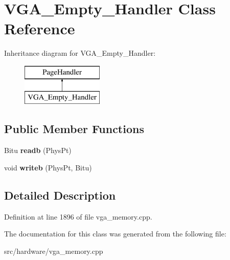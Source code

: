 \hypertarget{classVGA__Empty__Handler}{\section{V\-G\-A\-\_\-\-Empty\-\_\-\-Handler Class Reference}
\label{classVGA__Empty__Handler}
}
Inheritance diagram for V\-G\-A\-\_\-\-Empty\-\_\-\-Handler\-:\begin{figure}[H]
\begin{center}
\leavevmode
\includegraphics[height=2.000000cm]{classVGA__Empty__Handler}
\end{center}
\end{figure}
\subsection*{Public Member Functions}
\begin{DoxyCompactItemize}
\item 
\hypertarget{classVGA__Empty__Handler_ae84a276c3421d6db0f08b48d81692905}{Bitu {\bfseries readb} (Phys\-Pt)}\label{classVGA__Empty__Handler_ae84a276c3421d6db0f08b48d81692905}

\item 
\hypertarget{classVGA__Empty__Handler_a291f19e5b04518175d51cb6089424004}{void {\bfseries writeb} (Phys\-Pt, Bitu)}\label{classVGA__Empty__Handler_a291f19e5b04518175d51cb6089424004}

\end{DoxyCompactItemize}


\subsection{Detailed Description}


Definition at line 1896 of file vga\-\_\-memory.\-cpp.



The documentation for this class was generated from the following file\-:\begin{DoxyCompactItemize}
\item 
src/hardware/vga\-\_\-memory.\-cpp\end{DoxyCompactItemize}
